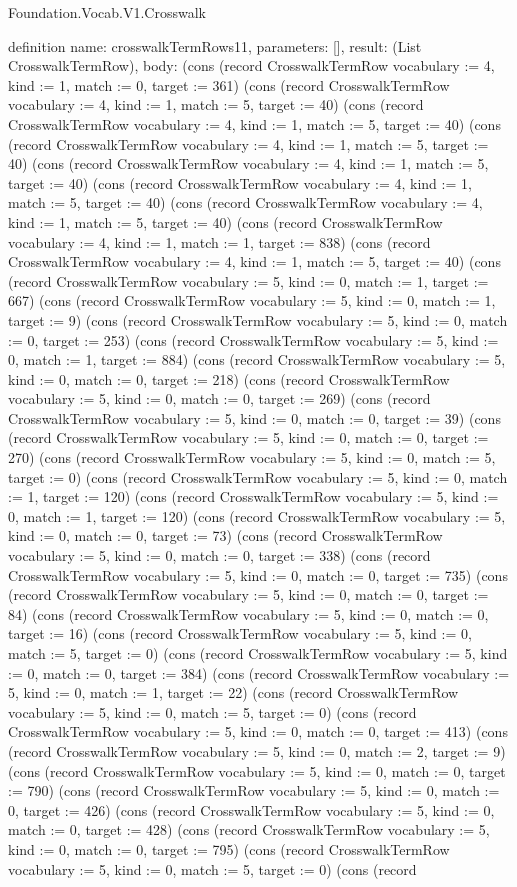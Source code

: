 \begin{lexlean}{Foundation.Vocab.V1.Crosswalk}
\begin{semanticmodule}
definition{
  name: crosswalkTermRows11,
  parameters: [],
  result: (List CrosswalkTermRow),
  body: (cons (record CrosswalkTermRow {vocabulary := 4, kind := 1, match := 0, target := 361}) (cons (record CrosswalkTermRow {vocabulary := 4, kind := 1, match := 5, target := 40}) (cons (record CrosswalkTermRow {vocabulary := 4, kind := 1, match := 5, target := 40}) (cons (record CrosswalkTermRow {vocabulary := 4, kind := 1, match := 5, target := 40}) (cons (record CrosswalkTermRow {vocabulary := 4, kind := 1, match := 5, target := 40}) (cons (record CrosswalkTermRow {vocabulary := 4, kind := 1, match := 5, target := 40}) (cons (record CrosswalkTermRow {vocabulary := 4, kind := 1, match := 5, target := 40}) (cons (record CrosswalkTermRow {vocabulary := 4, kind := 1, match := 1, target := 838}) (cons (record CrosswalkTermRow {vocabulary := 4, kind := 1, match := 5, target := 40}) (cons (record CrosswalkTermRow {vocabulary := 5, kind := 0, match := 1, target := 667}) (cons (record CrosswalkTermRow {vocabulary := 5, kind := 0, match := 1, target := 9}) (cons (record CrosswalkTermRow {vocabulary := 5, kind := 0, match := 0, target := 253}) (cons (record CrosswalkTermRow {vocabulary := 5, kind := 0, match := 1, target := 884}) (cons (record CrosswalkTermRow {vocabulary := 5, kind := 0, match := 0, target := 218}) (cons (record CrosswalkTermRow {vocabulary := 5, kind := 0, match := 0, target := 269}) (cons (record CrosswalkTermRow {vocabulary := 5, kind := 0, match := 0, target := 39}) (cons (record CrosswalkTermRow {vocabulary := 5, kind := 0, match := 0, target := 270}) (cons (record CrosswalkTermRow {vocabulary := 5, kind := 0, match := 5, target := 0}) (cons (record CrosswalkTermRow {vocabulary := 5, kind := 0, match := 1, target := 120}) (cons (record CrosswalkTermRow {vocabulary := 5, kind := 0, match := 1, target := 120}) (cons (record CrosswalkTermRow {vocabulary := 5, kind := 0, match := 0, target := 73}) (cons (record CrosswalkTermRow {vocabulary := 5, kind := 0, match := 0, target := 338}) (cons (record CrosswalkTermRow {vocabulary := 5, kind := 0, match := 0, target := 735}) (cons (record CrosswalkTermRow {vocabulary := 5, kind := 0, match := 0, target := 84}) (cons (record CrosswalkTermRow {vocabulary := 5, kind := 0, match := 0, target := 16}) (cons (record CrosswalkTermRow {vocabulary := 5, kind := 0, match := 5, target := 0}) (cons (record CrosswalkTermRow {vocabulary := 5, kind := 0, match := 0, target := 384}) (cons (record CrosswalkTermRow {vocabulary := 5, kind := 0, match := 1, target := 22}) (cons (record CrosswalkTermRow {vocabulary := 5, kind := 0, match := 5, target := 0}) (cons (record CrosswalkTermRow {vocabulary := 5, kind := 0, match := 0, target := 413}) (cons (record CrosswalkTermRow {vocabulary := 5, kind := 0, match := 2, target := 9}) (cons (record CrosswalkTermRow {vocabulary := 5, kind := 0, match := 0, target := 790}) (cons (record CrosswalkTermRow {vocabulary := 5, kind := 0, match := 0, target := 426}) (cons (record CrosswalkTermRow {vocabulary := 5, kind := 0, match := 0, target := 428}) (cons (record CrosswalkTermRow {vocabulary := 5, kind := 0, match := 0, target := 795}) (cons (record CrosswalkTermRow {vocabulary := 5, kind := 0, match := 5, target := 0}) (cons (record }
\end{semanticmodule}
\end{lexlean}
